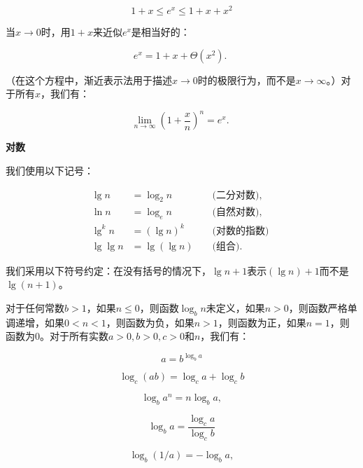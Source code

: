 \documentclass[lang=cn,newtx,10pt,scheme=chinese]{elegantbook}
\begin{document}
\begin{equation}
1+x \leq e^x \leq 1+x+x^2
\end{equation}

当$x \rightarrow 0$时，用$1+x$来近似$e^x$是相当好的：

$$
e^x=1+x+\Theta\left(x^2\right) \text {. }
$$

（在这个方程中，渐近表示法用于描述$x \rightarrow 0$时的极限行为，而不是$x \rightarrow \infty$。）对于所有$x$，我们有：

\begin{equation}
\lim _{n \rightarrow \infty}\left(1+\frac{x}{n}\right)^n=e^x \text {. }
\end{equation}

\textbf{对数}

我们使用以下记号：

$$
\begin{aligned}
\lg n & =\log _2 n & & \text { (二分对数), } \\
\ln n & =\log _e n & & \text { (自然对数), } \\
\lg ^k n & =(\lg n)^k & & \text { (对数的指数) } \\
\lg \lg n & =\lg (\lg n) & & \text { (组合). }
\end{aligned}
$$

我们采用以下符号约定：在没有括号的情况下，$\lg n+1$表示$(\lg n)+1$而不是$\lg (n+1)$。

对于任何常数$b>1$，如果$n \leq 0$，则函数$\log _b n$未定义，如果$n>0$，则函数严格单调递增，如果$0<n<1$，则函数为负，如果$n>1$，则函数为正，如果$n=1$，则函数为0。对于所有实数$a>0, b>0, c>0$和$n$，我们有：

\begin{equation}
a=b^{\log _b a}
\end{equation}

\begin{equation}
\log _c(a b)=\log _c a+\log _c b
\end{equation}

\begin{equation}
\log _b a^n=n \log _b a,
\end{equation}

\begin{equation}
\log _b a=\frac{\log _c a}{\log _c b}
\end{equation}

\begin{equation}
\log _b(1 / a)=-\log _b a,
\end{equation}
\end{document}
